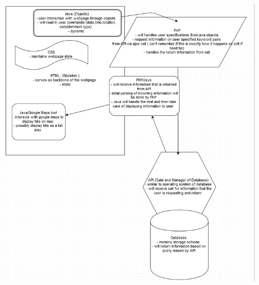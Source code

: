 \documentclass[11pt,letter]{article}
\begin{document}
\begin{enumerate}
\includegraphics[scale=0.7]{flow.jpg}

\end{enumerate}
\end{document}
